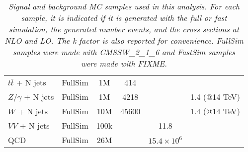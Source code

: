 \begin{table}[htb]
\begin{center}
\begin{tabular}{|l|ccccc|}
      $t\bar{t}$ + N jets       & FullSim      &  1M          & 414                 &                    & \\
      $Z/\gamma$ + N jets       & FullSim      &  1M          & 4218                &                    & 1.4 (@14 TeV)\\
      $W$ + N jets              & FullSim      & 10M          & 45600               &                    & 1.4 (@14 TeV)\\
      $VV$ + N jets             & FullSim      & 100k         &                     & 11.8               & \\
      QCD                       & FullSim      & 26M          &                     & $15.4 \times 10^6$ & \\
       \hline\hline
    \end{tabular}
    \caption{\small \sl Signal and background MC samples used in this analysis. For each sample, it is indicated 
      if it is generated with the full or fast simulation, the generated number events, and the cross sections at NLO and LO. 
      The k-factor is also reported for convenience.
      FullSim samples were made with CMSSW\_2\_1\_6 and FastSim samples were made with FIXME.}
  \end{center}
\end{table}

 


%

